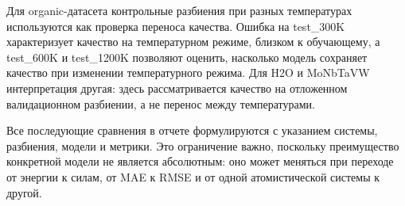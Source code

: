 Для organic-датасета контрольные разбиения при разных температурах используются как проверка переноса качества. Ошибка на test\_300K характеризует качество на температурном режиме, близком к обучающему, а test\_600K и test\_1200K позволяют оценить, насколько модель сохраняет качество при изменении температурного режима. Для H2O и MoNbTaVW интерпретация другая: здесь рассматривается качество на отложенном валидационном разбиении, а не перенос между температурами.

Все последующие сравнения в отчете формулируются с указанием системы, разбиения, модели и метрики. Это ограничение важно, поскольку преимущество конкретной модели не является абсолютным: оно может меняться при переходе от энергии к силам, от MAE к RMSE и от одной атомистической системы к другой.
